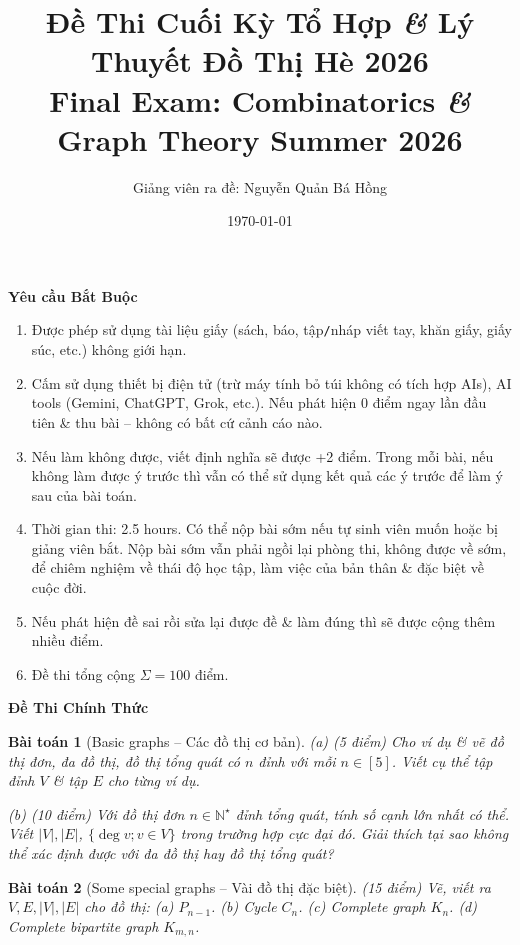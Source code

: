 \documentclass{article}
\title{Đề Thi Cuối Kỳ Tổ Hợp {\it\&} Lý Thuyết Đồ Thị Hè 2026\\Final Exam: Combinatorics {\it\&} Graph Theory Summer 2026}
\author{Giảng viên ra đề: Nguyễn Quản Bá Hồng}
\date{\today}
\newtheorem{baitoan}{Bài toán}
\begin{document}
\maketitle
\begin{center}\large
    \textbf{\textsf{Yêu cầu Bắt Buộc}}
\end{center}

\begin{enumerate}
    \item Được phép sử dụng tài liệu giấy (sách, báo, tập{\tt/}nháp viết tay, khăn giấy, giấy súc, etc.) không giới hạn.
    \item Cấm sử dụng thiết bị điện tử (trừ máy tính bỏ túi không có tích hợp AIs), AI tools (Gemini, ChatGPT, Grok, etc.). Nếu phát hiện 0 điểm ngay lần đầu tiên \& thu bài -- không có bất cứ cảnh cáo nào.
    \item Nếu làm không được, viết định nghĩa sẽ được +2 điểm. Trong mỗi bài, nếu không làm được ý trước thì vẫn có thể sử dụng kết quả các ý trước để làm ý sau của bài toán.
    \item Thời gian thi: 2.5 hours. Có thể nộp bài sớm nếu tự sinh viên muốn hoặc bị giảng viên bắt. Nộp bài sớm vẫn phải ngồi lại phòng thi, không được về sớm, để chiêm nghiệm về thái độ học tập, làm việc của bản thân \& đặc biệt về cuộc đời.
    \item Nếu phát hiện đề sai rồi sửa lại được đề \& làm đúng thì sẽ được cộng thêm nhiều điểm.
    \item Đề thi tổng cộng $\Sigma = 100$ điểm.
\end{enumerate}

\begin{center}\large
    \textbf{\textsf{Đề Thi Chính Thức}}
\end{center}

\begin{baitoan}[Basic graphs -- Các đồ thị cơ bản]
	(a) \emph{(5 điểm)} Cho ví dụ \& vẽ đồ thị đơn, đa đồ thị, đồ thị tổng quát có $n$ đỉnh với mỗi $n\in[5]$. Viết cụ thể tập đỉnh $V$ \& tập $E$ cho từng ví dụ.
	\item(b) \emph{(10 điểm)} Với đồ thị đơn $n\in\mathbb{N}^\star$ đỉnh tổng quát, tính số cạnh lớn nhất có thể. Viết $|V|,|E|$, $\{\deg v;v\in V\}$ trong trường hợp cực đại đó. Giải thích tại sao không thể xác định được với đa đồ thị hay đồ thị tổng quát?
\end{baitoan}

\begin{baitoan}[Some special graphs -- Vài đồ thị đặc biệt]
	\emph{(15 điểm)} Vẽ, viết ra $V,E,|V|,|E|$ cho đồ thị: (a) $P_{n-1}$. (b) Cycle $C_n$. (c) Complete graph $K_n$. (d) Complete bipartite graph $K_{m,n}$.
\end{baitoan}
\end{document}

